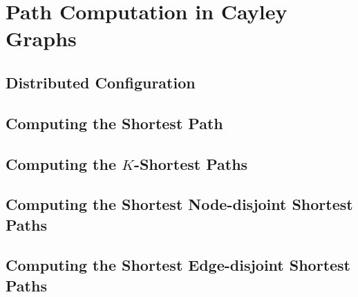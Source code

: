 
\chapter{Path Computation in Cayley Graphs}
\label{ch:path_comp_in_cg} %



\ifpdf
    \graphicspath{{4_path_comp_in_cg/figures/PNG/}{4_path_comp_in_cg/figures/PDF/}{4_path_comp_in_cg/figures/}}
\else
    \graphicspath{{4_path_comp_in_cg/figures/EPS/}{4_path_comp_in_cg/figures/}}
\fi


\section{Distributed Configuration}

\section{Computing the Shortest Path}

\section{Computing the $K$-Shortest Paths}

\section{Computing the Shortest Node-disjoint Shortest Paths}

\section{Computing the Shortest Edge-disjoint Shortest Paths}


